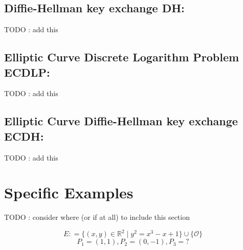 \documentclass[bp,en]{FEIstyle}
\begin{document}
\subsection*{Diffie-Hellman key exchange DH:}

TODO : add this 


\subsection*{Elliptic Curve Discrete Logarithm Problem ECDLP:}

TODO : add this 

\subsection*{Elliptic Curve Diffie-Hellman key exchange ECDH:}

TODO : add this 


\newpage

\section*{Specific Examples}

TODO : consider where (or if at all) to include this section \par
\[
E: = \{ (x,y) \in \mathbb{R}^2 \mid y^2=x^3-x+1\}\cup\{\mathcal{O}\} 
\]
\[
P_1 = (1, 1), P_2 = (0, -1), P_3 = ?
\]
\end{document}
